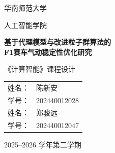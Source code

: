 \begin{titlepage}

\centering

\vspace*{2cm}

{\Huge\heiti 华南师范大学 \par}

\vspace{0.5cm}

{\Large 人工智能学院 \par}

\vspace{2.5cm}

{\Huge\bfseries
基于代理模型与改进粒子群算法的\\[0.4cm]
F1赛车气动稳定性优化研究
\par}

\vspace{2.5cm}

{\Large 《计算智能》课程设计}

\vfill

\begin{tabular}{rl}
姓名： & 陈新安 \\
学号： & 202440012028 \\[0.3cm]
姓名： & 郑骏远 \\
学号： & 202440012047
\end{tabular}

\vfill

{\large
2025--2026 学年第二学期
}

\vspace{1cm}

\end{titlepage}
